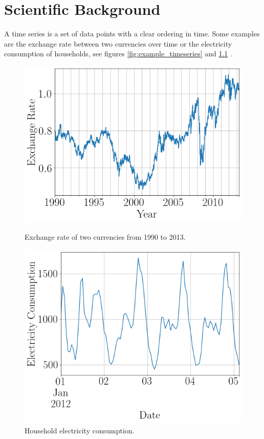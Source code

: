 \chapter{Scientific Background}
\label{cha:chapter2}

A time series is a set of data points with a clear ordering in time. Some examples are the exchange rate between two currencies over time or the electricity consumption of households, see figures \ref{fig:example_timeseries} and \ref{fig:example_timeseries_electricity} \cite{gluonts_paper}.

\begin{figure}[htb]
  \centering
  \includegraphics[width=\linewidth]{./img/exchange_rate_zoomed_2.png}
  \caption{Exchange rate of two currencies from 1990 to 2013.}
  \label{fig:example_timeseries}
  \endminipage\hfill
  \includegraphics[width=\linewidth]{./img/electricity_zoomed_3.png}
  \caption{Household electricity consumption.}
  \label{fig:example_timeseries_electricity}
  \endminipage\hfill
\end{figure}


